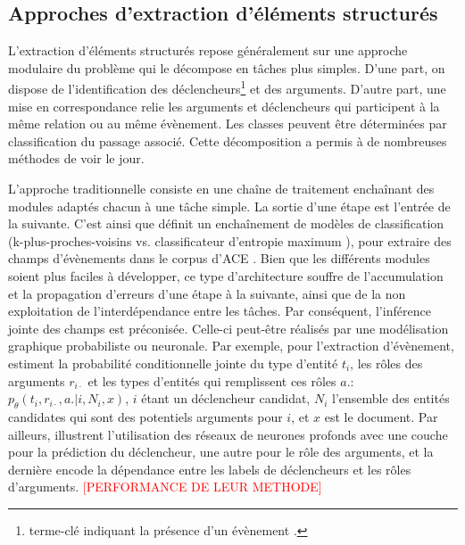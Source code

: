 \subsection{Approches d'extraction d'éléments structurés}
\label{quanta:related-approaches}
L'extraction d'éléments structurés repose généralement sur une approche modulaire du problème qui le décompose en tâches plus simples. D'une part, on dispose de l'identification des déclencheurs\footnote{terme-clé indiquant la présence d'un évènement \citep{ace2005event}.} et des arguments. D'autre part, une mise en correspondance relie les arguments et déclencheurs qui participent à la même relation ou au même évènement. Les classes peuvent être déterminées par classification du passage associé. Cette décomposition a permis à de nombreuses méthodes de voir le jour. 

L'approche traditionnelle consiste en une chaîne de traitement enchaînant des modules adaptés chacun à une tâche simple. La sortie d'une étape est l'entrée de la suivante. C'est ainsi que \citet{ahn2006stages} définit un enchaînement de modèles de classification (k-plus-proches-voisins \citep{cover1967knn} vs. classificateur d'entropie maximum \citep{nigam1999maxent}), pour extraire des champs d'évènements dans le corpus d'ACE \citep{ace2005event}. Bien que les différents modules soient plus faciles à développer, ce type d'architecture souffre de l'accumulation et la propagation d'erreurs d'une étape à la suivante, ainsi que de la non exploitation de l'interdépendance entre les tâches. Par conséquent, l'inférence jointe des champs est préconisée. Celle-ci peut-être réalisés par une modélisation graphique probabiliste ou neuronale. Par exemple, pour l'extraction d'évènement, \citet{yang2016jointEntityEvt} estiment la probabilité conditionnelle jointe du type d'entité $t_i$, les rôles des arguments $r_{i\cdot}$ et les types d'entités qui remplissent ces rôles $a.$: $p_\theta(t_i,r_{i\cdot},a. \vert i, N_i, x)$, $i$ étant un déclencheur candidat, $N_i$ l'ensemble des entités candidates qui sont des potentiels arguments pour $i$, et $x$ est le document. Par ailleurs, \citet{nguyen2016jointtrgarg} illustrent l'utilisation des réseaux de neurones profonds avec une couche pour la prédiction du déclencheur, une autre pour le rôle des arguments, et la dernière encode la dépendance entre les labels de déclencheurs et les rôles d'arguments. \textcolor{red}{[PERFORMANCE DE LEUR METHODE]} 

